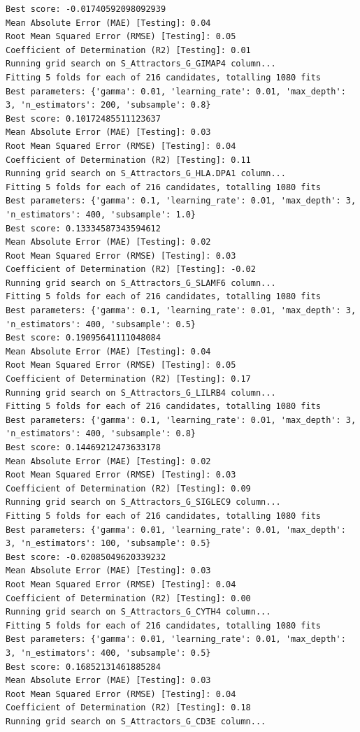 \documentclass[
  letterpaper,
  DIV=11,
  numbers=noendperiod]{scrartcl}
\begin{document}
\begin{verbatim}
Best score: -0.01740592098092939
Mean Absolute Error (MAE) [Testing]: 0.04
Root Mean Squared Error (RMSE) [Testing]: 0.05
Coefficient of Determination (R2) [Testing]: 0.01
Running grid search on S_Attractors_G_GIMAP4 column...
Fitting 5 folds for each of 216 candidates, totalling 1080 fits
Best parameters: {'gamma': 0.01, 'learning_rate': 0.01, 'max_depth': 3, 'n_estimators': 200, 'subsample': 0.8}
Best score: 0.10172485511123637
Mean Absolute Error (MAE) [Testing]: 0.03
Root Mean Squared Error (RMSE) [Testing]: 0.04
Coefficient of Determination (R2) [Testing]: 0.11
Running grid search on S_Attractors_G_HLA.DPA1 column...
Fitting 5 folds for each of 216 candidates, totalling 1080 fits
Best parameters: {'gamma': 0.1, 'learning_rate': 0.01, 'max_depth': 3, 'n_estimators': 400, 'subsample': 1.0}
Best score: 0.13334587343594612
Mean Absolute Error (MAE) [Testing]: 0.02
Root Mean Squared Error (RMSE) [Testing]: 0.03
Coefficient of Determination (R2) [Testing]: -0.02
Running grid search on S_Attractors_G_SLAMF6 column...
Fitting 5 folds for each of 216 candidates, totalling 1080 fits
Best parameters: {'gamma': 0.1, 'learning_rate': 0.01, 'max_depth': 3, 'n_estimators': 400, 'subsample': 0.5}
Best score: 0.19095641111048084
Mean Absolute Error (MAE) [Testing]: 0.04
Root Mean Squared Error (RMSE) [Testing]: 0.05
Coefficient of Determination (R2) [Testing]: 0.17
Running grid search on S_Attractors_G_LILRB4 column...
Fitting 5 folds for each of 216 candidates, totalling 1080 fits
Best parameters: {'gamma': 0.1, 'learning_rate': 0.01, 'max_depth': 3, 'n_estimators': 400, 'subsample': 0.8}
Best score: 0.14469212473633178
Mean Absolute Error (MAE) [Testing]: 0.02
Root Mean Squared Error (RMSE) [Testing]: 0.03
Coefficient of Determination (R2) [Testing]: 0.09
Running grid search on S_Attractors_G_SIGLEC9 column...
Fitting 5 folds for each of 216 candidates, totalling 1080 fits
Best parameters: {'gamma': 0.01, 'learning_rate': 0.01, 'max_depth': 3, 'n_estimators': 100, 'subsample': 0.5}
Best score: -0.02085049620339232
Mean Absolute Error (MAE) [Testing]: 0.03
Root Mean Squared Error (RMSE) [Testing]: 0.04
Coefficient of Determination (R2) [Testing]: 0.00
Running grid search on S_Attractors_G_CYTH4 column...
Fitting 5 folds for each of 216 candidates, totalling 1080 fits
Best parameters: {'gamma': 0.01, 'learning_rate': 0.01, 'max_depth': 3, 'n_estimators': 400, 'subsample': 0.5}
Best score: 0.16852131461885284
Mean Absolute Error (MAE) [Testing]: 0.03
Root Mean Squared Error (RMSE) [Testing]: 0.04
Coefficient of Determination (R2) [Testing]: 0.18
Running grid search on S_Attractors_G_CD3E column...

\end{verbatim}
\end{document}
